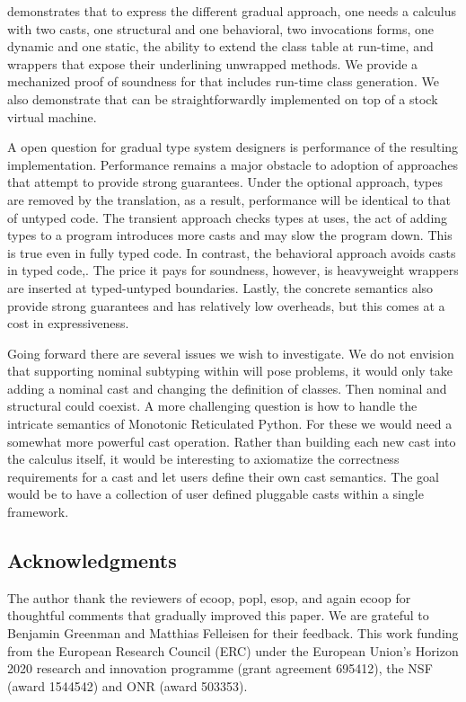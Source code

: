 \documentclass[USenglish]{tex/lipics-v2016}
\begin{document}
\kafka demonstrates that to express the different gradual approach, one
needs a calculus with two casts, one structural and one behavioral, two
invocations forms, one dynamic and one static, the ability to extend the
class table at run-time, and wrappers that expose their underlining
unwrapped methods.  We provide a mechanized proof of soundness for \kafka
that includes run-time class generation.  We also demonstrate that \kafka
can be straightforwardly implemented on top of a stock virtual machine.

A open question for gradual type system designers is performance of the
resulting implementation. Performance remains a major obstacle to adoption
of approaches that attempt to provide strong guarantees.  Under the optional
approach, types are removed by the translation, as a result, performance
will be identical to that of untyped code.  The transient approach checks
types at uses, the act of adding types to a program introduces more casts
and may slow the program down. This is true even in fully typed code.  In
contrast, the behavioral approach avoids casts in typed code,. The price it
pays for soundness, however, is heavyweight wrappers are inserted at
typed-untyped boundaries.  Lastly, the concrete semantics also provide
strong guarantees and has relatively low overheads, but this comes at a cost
in expressiveness.

Going forward there are several issues we wish to investigate.  We do not
envision that supporting nominal subtyping within \kafka will pose problems,
it would only take adding a nominal cast and changing the definition of
classes. Then nominal and structural could coexist. A more challenging
question is how to handle the intricate semantics of Monotonic Reticulated
Python. For these we would need a somewhat more powerful cast operation.
Rather than building each new cast into the calculus itself, it would be
interesting to axiomatize the correctness requirements for a cast and let
users define their own cast semantics. The goal would be to have a
collection of user defined pluggable casts within a single framework.

\subsection*{Acknowledgments} The author thank the reviewers of {\sc ecoop},
{\sc popl}, {\sc esop}, and again {\sc ecoop} for thoughtful comments that
gradually improved this paper. We are grateful to Benjamin Greenman and
Matthias Felleisen for their feedback.  This work funding from the European
Research Council (ERC) under the European Union’s Horizon 2020 research and
innovation programme (grant agreement 695412), the NSF (award 1544542) and
ONR (award 503353).




\end{document}
